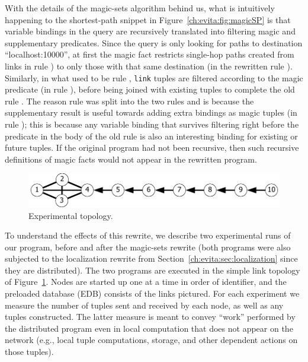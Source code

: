 With the details of the magic-sets algorithm behind us, what is
intuitively happening to the shortest-path snippet in
Figure~\ref{ch:evita:fig:magicSP} is that variable bindings in the query are
recursively translated into filtering magic and supplementary
predicates. Since the query is only looking for paths to
destination ``localhost:10000'', at first the magic fact restricts single-hop
paths created from links in rule ) to only those with that same 
destination (in the rewritten rule ). Similarly, in what used to 
be rule , {\tt link} tuples are filtered according to the magic predicate (in rule
), before being joined with existing  tuples to
complete the old rule . The reason rule  was split into
the two rules  and  is because the
supplementary result  is useful towards adding extra bindings as
magic tuples (in rule ); this is because any variable
binding that survives filtering right before the 
predicate in the body of the old rule  is also an interesting
binding for existing or future  tuples. If the original
program had not been recursive, then such recursive definitions of magic
facts would not appear in the rewritten program.

\begin{figure}
\centering
\includegraphics[scale=1.2]{figures/Topology}
\caption{Experimental topology.}
\label{ch:evita:fig:topo}
\end{figure}

To understand the effects of this rewrite, we describe two experimental
runs of our program, before and after the magic-sets rewrite (both
programs were also subjected to the localization rewrite from
Section~\ref{ch:evita:sec:localization} since they are distributed).  The two
programs are executed in the simple link topology of
Figure~\ref{ch:evita:fig:topo}. Nodes are started up one at a time in order of
identifier, and the preloaded database (EDB) consists of the links pictured. For each experiment we measure the number of
tuples sent and received by each node, as well as any 
tuples constructed. The latter measure is meant to convey ``work''
performed by the distributed program even in local computation that does
not appear on the network (e.g., local tuple computations, storage, and
other dependent actions on those tuples).

